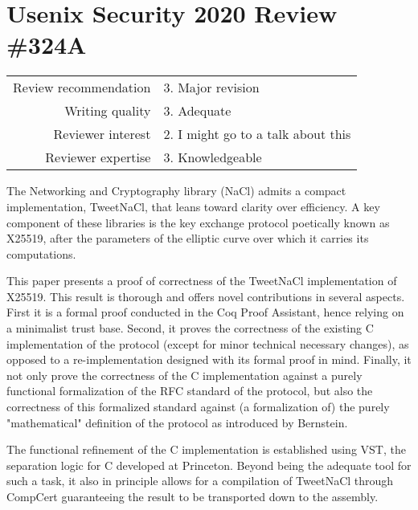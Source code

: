 \section*{Usenix Security 2020 Review \#324A}

\begin{tabular}{rl}
    \toprule
    Review recommendation & 3. Major revision                  \\
    Writing quality       & 3. Adequate                        \\
    Reviewer interest     & 2. I might go to a talk about this \\
    Reviewer expertise    & 3. Knowledgeable                   \\
    \bottomrule
\end{tabular}




\begin{center}
\end{center}

The Networking and Cryptography library (NaCl) admits a compact implementation,
TweetNaCl, that leans toward clarity over efficiency.
A key component of these libraries is the key exchange protocol poetically known
as X25519, after the parameters of the elliptic curve over which it carries its
computations.

This paper presents a proof of correctness of the TweetNaCl implementation of X25519.
This result is thorough and offers novel contributions in several aspects.
First it is a formal proof conducted in the Coq Proof Assistant, hence relying on a
minimalist trust base.
Second, it proves the correctness of the existing C implementation of the protocol
(except for minor technical necessary changes), as opposed to a re-implementation
designed with its formal proof in mind.
Finally, it not only prove the correctness of the C implementation against a
purely functional formalization of the RFC standard of the protocol, but also
the correctness of this formalized standard against (a formalization of) the purely
"mathematical" definition of the protocol as introduced by Bernstein.

The functional refinement of the C implementation is established using VST,
the separation logic for C developed at Princeton. Beyond being the adequate
tool for such a task, it also in principle allows for a compilation of TweetNaCl
through CompCert guaranteeing the result to be transported down to the assembly.

